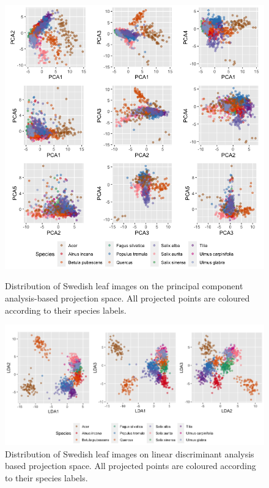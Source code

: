 \documentclass{article}
\begin{document}
\begin{figure}
\centering
\includegraphics[width=0.9\columnwidth]{img/swedishspeciespca.png}
\caption{\label{pcaswedishsp}Distribution of Swedish leaf images on the
principal component analysis-based projection space. All
projected points are coloured according to their species labels.}
\includegraphics[width=0.8\columnwidth]{img/swedishldaspecies.png}
\caption{\label{ldaswedishsp}Distribution of Swedish leaf images on linear discriminant analysis based projection space. All
projected points are coloured according to their species labels.}
\end{figure}
\end{document}
